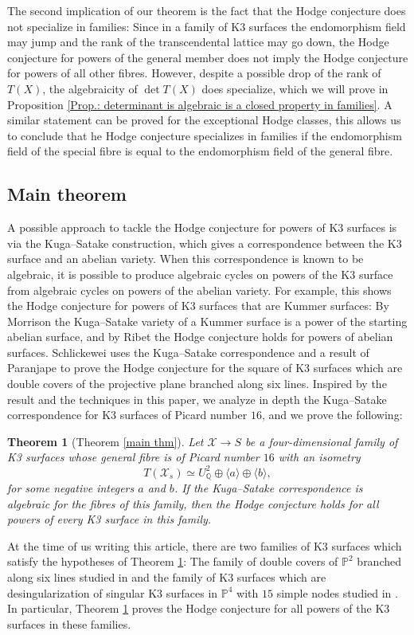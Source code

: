 \documentclass[11pt,twoside,a4paper]{amsart}
\newcommand{\0}{\mathscr{O}}
\newcommand{\p}{\mathbb{P}}
\newcommand{\Q}{\mathbb{Q}}
\theoremstyle{plain}
\newtheorem{thm}{Theorem}[section]
\theoremstyle{definition}
\theoremstyle{remark}
\begin{document}
\smallskip

The second implication of our theorem is the fact that the Hodge conjecture does not specialize in families: Since in a family of K3 surfaces the endomorphism field may jump and the rank of the transcendental lattice may go down, the Hodge conjecture for powers of the general member does not imply the Hodge conjecture for powers of all other fibres. However, despite a possible drop of the rank of $T(X)$, the algebraicity of $\det T(X)$ does specialize, which we will prove in Proposition \ref{Prop.: determinant is algebraic is a closed property in families}. A similar statement can be proved for the exceptional Hodge classes, this allows us to conclude that he Hodge conjecture specializes in families if the endomorphism field of the special fibre is equal to the endomorphism field of the general
fibre.

\subsection{Main theorem}
A possible approach to tackle the Hodge conjecture for powers of K3 surfaces is via the Kuga--Satake construction, which gives a correspondence between the K3 surface and an abelian variety. When this correspondence is known to be algebraic, it is possible to produce algebraic cycles on powers of the K3 surface from algebraic cycles on powers of the abelian variety. For example, this shows the Hodge conjecture for powers of K3 surfaces that are Kummer surfaces: By Morrison \cite{morrison1984k3} the Kuga--Satake variety of a Kummer surface is a power of the starting abelian surface, and by Ribet \cite{ribet1983hodge} the Hodge conjecture holds for powers of abelian surfaces. Schlickewei \cite{schlickewei2010hodge} uses the Kuga--Satake correspondence and a result of Paranjape \cite{paranjape} to prove the Hodge conjecture for the square of K3 surfaces which are double covers of the projective plane branched along six lines. 
Inspired by the result and the techniques in this paper, we analyze in depth the Kuga--Satake correspondence for K3 surfaces of Picard number $16$, and we prove the following:
\begin{thm}[Theorem \ref{main thm}]
\label{main thm intro}
Let $\mathscr{X}\rightarrow S$ be a four-dimensional family of K3 surfaces whose general fibre is of Picard number $16$ with an isometry
\[
T(\mathscr{X}_s)\simeq U_\Q^2\oplus \langle a\rangle\oplus\langle b\rangle,
\]
for some negative integers $a$ and $b$. If the Kuga--Satake correspondence is algebraic for the fibres of this family, then the Hodge conjecture holds for all powers of every K3 surface in this family.
\end{thm}
At the time of us writing this article, there are two families of K3 surfaces which satisfy the hypotheses of Theorem \ref{main thm intro}: The family of double covers of $\p^2$ branched along six lines studied in \cite{schlickewei2010hodge} and the family of K3 surfaces which are desingularization of singular K3 surfaces in $\p^4$ with $15$ simple nodes studied in \cite{ingalls2020explicit}. In particular, Theorem \ref{main thm intro} proves the Hodge conjecture for all powers of the K3 surfaces in these families. 
\end{document}
